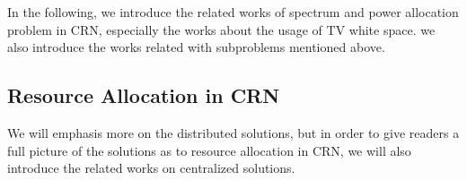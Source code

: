 In the following, we introduce the related works of spectrum and power allocation problem in CRN, especially the works about the usage of TV white space.
we also introduce the works related with subproblems mentioned above.




\subsection{Resource Allocation in CRN}

We will emphasis more on the distributed solutions, but in order to give readers a full picture of the solutions as to resource allocation in CRN, we will also introduce the related works on centralized solutions.

